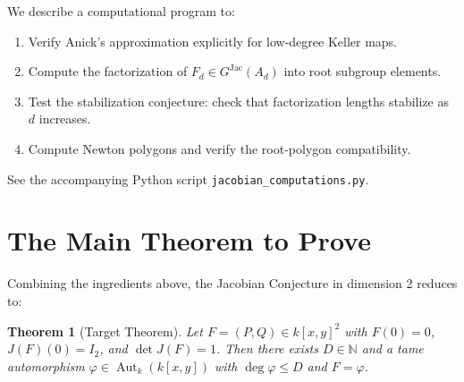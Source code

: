\documentclass[12pt,a4paper]{article}
\newtheorem{theorem}{Theorem}[section]
\theoremstyle{definition}
\newcommand{\NN}{\mathbb{N}}
\newcommand{\kk}{k}
\newcommand{\Aut}{\operatorname{Aut}}
\newcommand{\GJac}{G^{\mathrm{Jac}}}
\begin{document}
We describe a computational program to:
\begin{enumerate}
\item Verify Anick's approximation explicitly for low-degree Keller maps.
\item Compute the factorization of $F_d \in \GJac(A_d)$ into root subgroup elements.
\item Test the stabilization conjecture: check that factorization lengths stabilize as
  $d$ increases.
\item Compute Newton polygons and verify the root-polygon compatibility.
\end{enumerate}

See the accompanying Python script \texttt{jacobian\_computations.py}.

\section{The Main Theorem to Prove}

Combining the ingredients above, the Jacobian Conjecture in dimension 2 reduces to:

\begin{theorem}[Target Theorem]\label{thm:target}
Let $F = (P, Q) \in \kk[x,y]^2$ with $F(0) = 0$, $J(F)(0) = I_2$, and
$\det J(F) = 1$. Then there exists $D \in \NN$ and a tame automorphism
$\varphi \in \Aut_\kk(\kk[x,y])$ with $\deg \varphi \leq D$ and $F = \varphi$.
\end{theorem}
\end{document}
